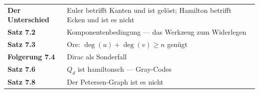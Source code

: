 \begin{merksatz}
\begin{center}
\renewcommand{\arraystretch}{1.5}
\begin{tabular}{@{}P{3.0cm}P{5.6cm}@{}}
\toprule
\textbf{Der Unterschied} & Euler betrifft Kanten und ist gelöst; Hamilton betrifft Ecken und ist es nicht\\
\textbf{Satz 7.2} & Komponentenbedingung --- das Werkzeug zum Widerlegen\\
\textbf{Satz 7.3} & Ore: $\deg(u) + \deg(v) \ge n$ genügt\\
\textbf{Folgerung 7.4} & Dirac als Sonderfall\\
\textbf{Satz 7.6} & $Q_d$ ist hamiltonsch --- Gray-Codes\\
\textbf{Satz 7.8} & Der Petersen-Graph ist es nicht\\
\bottomrule
\end{tabular}
\end{center}

\begin{center}
\begin{minipage}{0.88\textwidth}
\end{minipage}
\end{center}
\end{merksatz}
